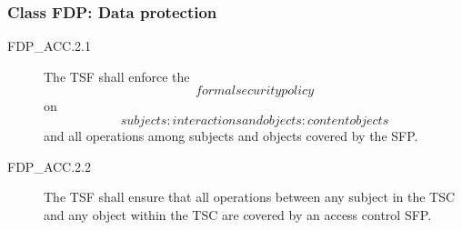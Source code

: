 \documentclass[12pt,english]{scrbook}
\begin{document}



\subsubsection{Class FDP: Data protection}





\begin{description}
\item[FDP{\_}ACC.2.1 ]

The TSF shall enforce the \emph{\[formal security policy\]} on
\emph{\[subjects: interactions and objects: content objects\]} and all
operations among subjects and objects covered by the SFP.

\item[FDP{\_}ACC.2.2]

The TSF shall ensure that all operations between any
subject in the TSC and any object within the TSC are covered by an
access control SFP.

\end{description}


\end{document}
